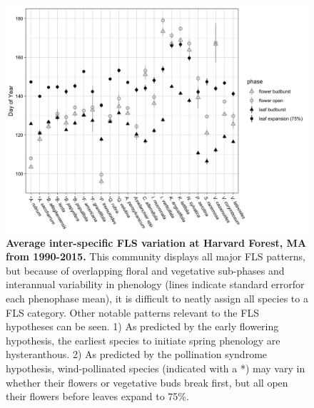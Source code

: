 \documentclass[12pt]{article}\usepackage[]{graphicx}\usepackage[]{color}
\begin{document}
\begin{figure}[ht]
    \centering
    \includegraphics[width=\textwidth]{..//figure/HFmeans_expanded.png}
    \caption{\textbf{Average inter-specific FLS variation at Harvard Forest, MA from 1990-2015.} This community displays all major FLS patterns, but because of overlapping floral and vegetative sub-phases and interannual variability in phenology (lines indicate standard errorfor each phenophase mean), it is difficult to neatly assign all species to a FLS category. Other notable patterns relevant to the FLS hypotheses can be seen. 1) As predicted by the early flowering hypothesis, the earliest species to initiate spring phenology are hysteranthous. 2) As predicted by the pollination syndrome hypothesis, wind-pollinated species (indicated with a *) may vary in whether their flowers or vegetative buds break first, but all open their flowers before leaves expand to 75\%.}
    \label{fig:Figure 2}
\end{figure}
\end{document}

